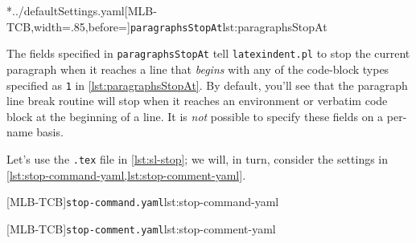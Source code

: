 	\cmhlistingsfromfile[style=paragraphsStopAt]*{../defaultSettings.yaml}[MLB-TCB,width=.85\linewidth,before=\centering]{\texttt{paragraphsStopAt}}{lst:paragraphsStopAt}

	The fields specified in \texttt{paragraphsStopAt} tell \texttt{latexindent.pl} to stop
	the current paragraph when it reaches a line that \emph{begins} with any of the
	code-block types specified as \texttt{1} in \cref{lst:paragraphsStopAt}. By default,
	you'll see that the paragraph line break routine will stop when it reaches an environment
	or verbatim code block at the beginning of a line. It is \emph{not} possible to specify
	these fields on a per-name basis.

	Let's use the \texttt{.tex} file in \cref{lst:sl-stop}; we will, in turn, consider the
	settings in \cref{lst:stop-command-yaml,lst:stop-comment-yaml}.

	\begin{minipage}{.45\linewidth}
	\end{minipage}
	\hfill
	\begin{minipage}{.49\linewidth}
		[MLB-TCB]{\texttt{stop-command.yaml}}{lst:stop-command-yaml}

		[MLB-TCB]{\texttt{stop-comment.yaml}}{lst:stop-comment-yaml}
	\end{minipage}


